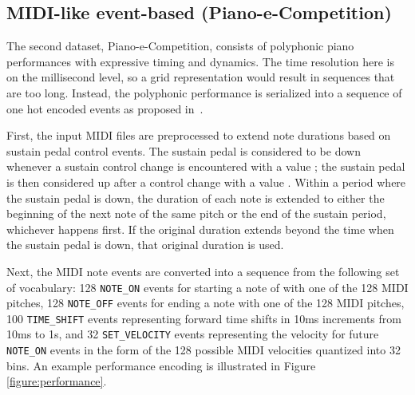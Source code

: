\documentclass{article} \usepackage{iclr2019_conference,times}
\begin{document}
\subsection{MIDI-like event-based (Piano-e-Competition)}
\label{sec:event-based}
The second dataset, Piano-e-Competition, consists of polyphonic piano performances with expressive timing and dynamics. The time resolution here is on the millisecond level, so a grid representation would result in sequences that are too long.  Instead, the polyphonic performance is serialized into a sequence of one hot encoded events as proposed in~\citep{oore2018time}.



First, the input MIDI files are preprocessed to extend note durations based on sustain pedal control events. The sustain pedal is considered to be down whenever a sustain control change is encountered with a value ; the sustain pedal is then considered up after a control change with a value . Within a period where the sustain pedal is down, the duration of each note is extended to either the beginning of the next note of the same pitch or the end of the sustain period, whichever happens first. If the original duration extends beyond the time when the sustain pedal is down, that original duration is used.

Next, the MIDI note events are converted into a sequence from the following set of vocabulary: 128 \verb|NOTE_ON| events for starting a note of with one of the 128 MIDI pitches, 128 \verb|NOTE_OFF| events for ending a note with one of the 128 MIDI pitches, 100 \verb|TIME_SHIFT| events representing forward time shifts in 10ms increments from 10ms to 1s, and 32 \verb|SET_VELOCITY| events representing the velocity for future \verb|NOTE_ON| events in the form of the 128 possible MIDI velocities quantized into 32 bins.  An example performance encoding is illustrated in Figure \ref{figure:performance}.
\end{document}
